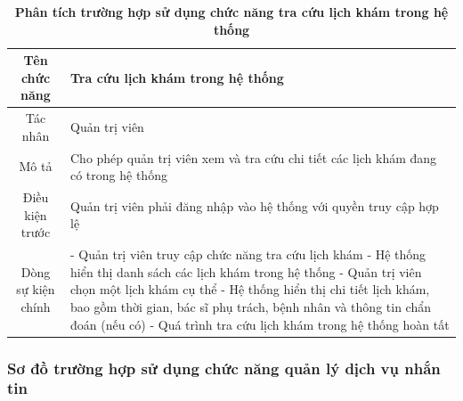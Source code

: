 \begin{table}[H]
	\caption{\bfseries \fontsize{12pt}{0pt}\selectfont Phân tích trường hợp sử dụng chức năng tra cứu lịch khám trong hệ thống}
	\centering
	\begin{tabularx}{0.9\textwidth}{|c|X|}
		\hline
		\textbf{Tên chức năng} & \textbf{Tra cứu lịch khám trong hệ thống}                                           \\
		\hline
		Tác nhân               & Quản trị viên                                                                       \\
		\hline
		Mô tả                  & Cho phép quản trị viên xem và tra cứu chi tiết các lịch khám đang có trong hệ thống \\
		\hline
		Điều kiện trước        & Quản trị viên phải đăng nhập vào hệ thống với quyền truy cập hợp lệ                 \\
		\hline
		Dòng sự kiện chính     &
		- Quản trị viên truy cập chức năng tra cứu lịch khám \newline
		- Hệ thống hiển thị danh sách các lịch khám trong hệ thống \newline
		- Quản trị viên chọn một lịch khám cụ thể \newline
		- Hệ thống hiển thị chi tiết lịch khám, bao gồm thời gian, bác sĩ phụ trách, bệnh nhân và thông tin chẩn đoán (nếu có) \newline
		- Quá trình tra cứu lịch khám trong hệ thống hoàn tất                                                        \\
		\hline
	\end{tabularx}
\end{table}


\subsubsection{Sơ đồ trường hợp sử dụng chức năng quản lý dịch vụ nhắn tin}

